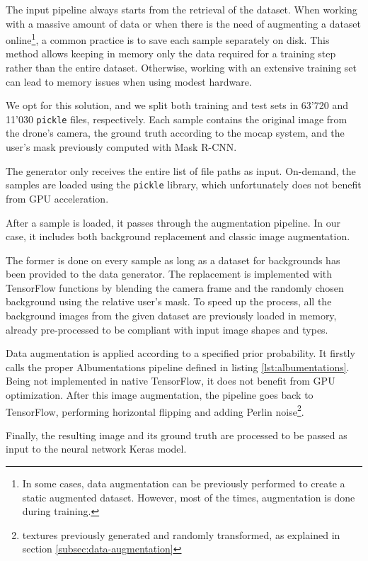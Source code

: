 The input pipeline always starts from the retrieval of the dataset. When working with a massive amount of data or when there is the need of augmenting a dataset online\footnote{In some cases, data augmentation can be previously performed to create a static augmented dataset. However, most of the times, augmentation is done during training.}, a common practice is to save each sample separately on disk. This method allows keeping in memory only the data required for a training step rather than the entire dataset. Otherwise, working with an extensive training set can lead to memory issues when using modest hardware.

We opt for this solution, and we split both training and test sets in 63'720 and 11'030 \texttt{pickle} files, respectively. Each sample contains the original image from the drone's camera, the ground truth according to the \gls{mocap} system, and the user's mask previously computed with Mask R-CNN.

\medskip

The generator only receives the entire list of file paths as input. On-demand, the samples are loaded using the \texttt{pickle} library, which unfortunately does not benefit from GPU acceleration. 

After a sample is loaded, it passes through the augmentation pipeline. In our case, it includes both background replacement and classic image augmentation. 

The former is done on every sample as long as a dataset for backgrounds has been provided to the data generator. The replacement is implemented with TensorFlow functions by blending the camera frame and the randomly chosen background using the relative user's mask. To speed up the process, all the background images from the given dataset are previously loaded in memory, already pre-processed to be compliant with input image shapes and types.

Data augmentation is applied according to a specified prior probability. It firstly calls the proper Albumentations pipeline defined in listing \ref{lst:albumentations}. Being not implemented in native TensorFlow, it does not benefit from GPU optimization. After this image augmentation, the pipeline goes back to TensorFlow, performing horizontal flipping and adding Perlin noise\footnote{textures previously generated and randomly transformed, as explained in section \ref{subsec:data-augmentation}}. 

Finally, the resulting image and its ground truth are processed to be passed as input to the neural network Keras model.

